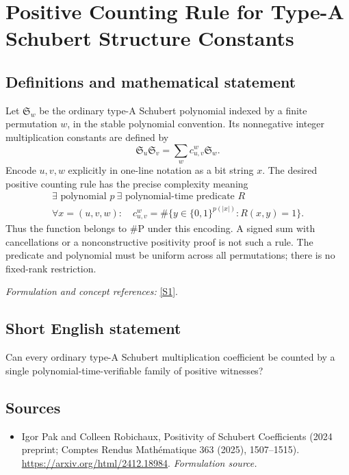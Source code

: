 \documentclass[11pt]{article}
\begin{document}
\section*{\texorpdfstring{Positive Counting Rule for Type-A Schubert Structure Constants}{Positive Counting Rule for Type-A Schubert Structure Constants}}\label{490}
\subsection{Definitions and mathematical statement}
Let $\mathfrak S_w$ be the ordinary type-A Schubert polynomial indexed by a finite permutation $w$, in the stable polynomial convention. Its nonnegative integer multiplication constants are defined by
\[
 \mathfrak S_u\mathfrak S_v=\sum_w c_{u,v}^{w}\mathfrak S_w.
\]
Encode $u,v,w$ explicitly in one-line notation as a bit string $x$. The desired positive counting rule has the precise complexity meaning
\[
 \begin{gathered}
 \exists\text{ polynomial }p\ \exists\text{ polynomial-time predicate }R\\
 \forall x=(u,v,w):\quad
 c_{u,v}^{w}=\#\{y\in\{0,1\}^{p(|x|)}:R(x,y)=1\}.
 \end{gathered}
\]
Thus the function belongs to $\#\mathrm P$ under this encoding. A signed sum with cancellations or a nonconstructive positivity proof is not such a rule. The predicate and polynomial must be uniform across all permutations; there is no fixed-rank restriction.
\par\smallskip\textit{Formulation and concept references:} \href{https://arxiv.org/html/2412.18984}{[S1]}.

\subsection{Short English statement}
Can every ordinary type-A Schubert multiplication coefficient be counted by a single polynomial-time-verifiable family of positive witnesses?
\subsection{Sources}
\begin{itemize}
\item[S1]Igor Pak and Colleen Robichaux, Positivity of Schubert Coefficients (2024 preprint; Comptes Rendus Mathématique 363 (2025), 1507–1515).
\url{https://arxiv.org/html/2412.18984}.
\textit{Formulation source.}
\end{itemize}
\end{document}
